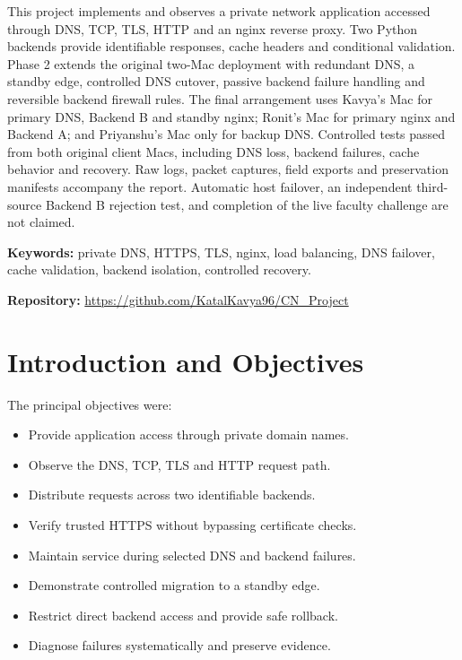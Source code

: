\documentclass[12pt,a4paper]{article}
\begin{document}
This project implements and observes a private network application accessed through DNS, TCP, TLS, HTTP and an nginx reverse proxy. Two Python backends provide identifiable responses, cache headers and conditional validation. Phase 2 extends the original two-Mac deployment with redundant DNS, a standby edge, controlled DNS cutover, passive backend failure handling and reversible backend firewall rules. The final arrangement uses Kavya's Mac for primary DNS, Backend B and standby nginx; Ronit's Mac for primary nginx and Backend A; and Priyanshu's Mac only for backup DNS. Controlled tests passed from both original client Macs, including DNS loss, backend failures, cache behavior and recovery. Raw logs, packet captures, field exports and preservation manifests accompany the report. Automatic host failover, an independent third-source Backend B rejection test, and completion of the live faculty challenge are not claimed.



\vspace{4mm}
\textbf{Keywords:} private DNS, HTTPS, TLS, nginx, load balancing, DNS failover,
cache validation, backend isolation, controlled recovery.

\vspace{4mm}
\textbf{Repository:} \url{https://github.com/KatalKavya96/CN_Project}

\clearpage
\tableofcontents
\clearpage
{}


\section{Introduction and Objectives}

The principal objectives were:
\begin{itemize}
\item Provide application access through private domain names.
\item Observe the DNS, TCP, TLS and HTTP request path.
\item Distribute requests across two identifiable backends.
\item Verify trusted HTTPS without bypassing certificate checks.
\item Maintain service during selected DNS and backend failures.
\item Demonstrate controlled migration to a standby edge.
\item Restrict direct backend access and provide safe rollback.
\item Diagnose failures systematically and preserve evidence.
\end{itemize}
\end{document}
